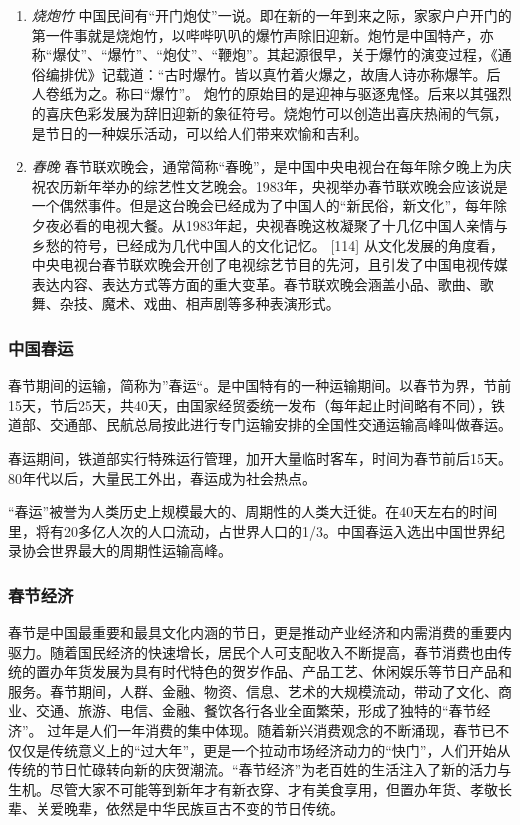 \begin{enumerate}
\item \emph{烧炮竹}
中国民间有“开门炮仗”一说。即在新的一年到来之际，家家户户开门的第一件事就是烧炮竹，以哔哔叭叭的爆竹声除旧迎新。炮竹是中国特产，亦称“爆仗”、“爆竹”、“炮仗”、“鞭炮”。其起源很早，关于爆竹的演变过程，《通俗编排优》记载道：“古时爆竹。皆以真竹着火爆之，故唐人诗亦称爆竿。后人卷纸为之。称曰“爆竹”。
炮竹的原始目的是迎神与驱逐鬼怪。后来以其强烈的喜庆色彩发展为辞旧迎新的象征符号。烧炮竹可以创造出喜庆热闹的气氛，是节日的一种娱乐活动，可以给人们带来欢愉和吉利。

\item \emph{春晚}
春节联欢晚会，通常简称“春晚”，是中国中央电视台在每年除夕晚上为庆祝农历新年举办的综艺性文艺晚会。1983年，央视举办春节联欢晚会应该说是一个偶然事件。但是这台晚会已经成为了中国人的“新民俗，新文化”，每年除夕夜必看的电视大餐。从1983年起，央视春晚这枚凝聚了十几亿中国人亲情与乡愁的符号，已经成为几代中国人的文化记忆。 [114] 
从文化发展的角度看，中央电视台春节联欢晚会开创了电视综艺节目的先河，且引发了中国电视传媒表达内容、表达方式等方面的重大变革。春节联欢晚会涵盖小品、歌曲、歌舞、杂技、魔术、戏曲、相声剧等多种表演形式。

\end{enumerate}

\subsubsection{中国春运}
\par
春节期间的运输，简称为”春运“。是中国特有的一种运输期间。以春节为界，节前15天，节后25天，共40天，由国家经贸委统一发布（每年起止时间略有不同），铁道部、交通部、民航总局按此进行专门运输安排的全国性交通运输高峰叫做春运。
\par
春运期间，铁道部实行特殊运行管理，加开大量临时客车，时间为春节前后15天。80年代以后，大量民工外出，春运成为社会热点。
\par
“春运”被誉为人类历史上规模最大的、周期性的人类大迁徙。在40天左右的时间里，将有20多亿人次的人口流动，占世界人口的1/3。中国春运入选出中国世界纪录协会世界最大的周期性运输高峰。


\subsubsection{春节经济}
春节是中国最重要和最具文化内涵的节日，更是推动产业经济和内需消费的重要内驱力。随着国民经济的快速增长，居民个人可支配收入不断提高，春节消费也由传统的置办年货发展为具有时代特色的贺岁作品、产品工艺、休闲娱乐等节日产品和服务。春节期间，人群、金融、物资、信息、艺术的大规模流动，带动了文化、商业、交通、旅游、电信、金融、餐饮各行各业全面繁荣，形成了独特的“春节经济”。
过年是人们一年消费的集中体现。随着新兴消费观念的不断涌现，春节已不仅仅是传统意义上的“过大年”，更是一个拉动市场经济动力的“快门”，人们开始从传统的节日忙碌转向新的庆贺潮流。“春节经济”为老百姓的生活注入了新的活力与生机。尽管大家不可能等到新年才有新衣穿、才有美食享用，但置办年货、孝敬长辈、关爱晚辈，依然是中华民族亘古不变的节日传统。





